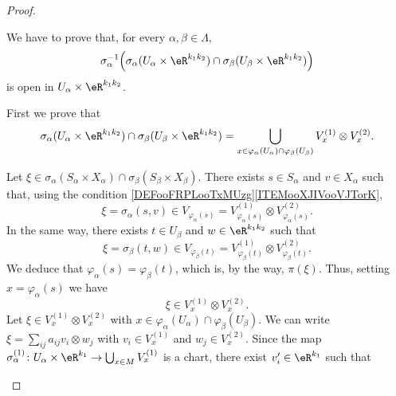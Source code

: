 \begin{proof}
\begin{subproof}
		We have to prove that, for every \( \alpha,\beta\in \Lambda\),
		\begin{equation}
			\sigma_{\alpha}^{-1}\Big( \sigma_{\alpha}(U_{\alpha}\times \eR^{k_1k_2})\cap \sigma_{\beta}(U_{\beta}\times \eR^{k_1k_2}) \Big)
		\end{equation}
		is open in \( U_{\alpha}\times \eR^{k_1k_2}\).

		First we prove that
		\begin{equation}		\label{EQooNWFCooWcxQxa}
			\sigma_{\alpha}(U_{\alpha}\times \eR^{k_1k_2})\cap \sigma_{\beta}(U_{\beta}\times \eR^{k_1k_2})=\bigcup_{x\in \varphi_{\alpha}(U_{\alpha})\cap \varphi_{\beta}(U_{\beta})}V_x^{(1)}\otimes V_x^{(2)}.
		\end{equation}
		\begin{subproof}
			Let \( \xi\in \sigma_{\alpha}(S_{\alpha}\times X_{\alpha})\cap \sigma_{\beta}(S_{\beta}\times X_{\beta})\). There exists \( s\in S_{\alpha}\) and \( v\in X_{\alpha}\) such that, using the condition \ref{DEFooFRPLooTxMUzg}\ref{ITEMooXJIVooVJTorK},
			\begin{equation}
				\xi=\sigma_{\alpha}(s,v)\in V_{\varphi_{\alpha}(s)}=V_{\varphi_{\alpha}(s)}^{(1)}\otimes V_{\varphi_{\alpha}(s)}^{(2)}.
			\end{equation}
			In the same way, there exists \( t\in U_{\beta}\) and \( w\in \eR^{k_1k_2}\) such that
			\begin{equation}
				\xi=\sigma_{\beta}(t,w)\in V_{\varphi_{\beta}(t)}=V_{\varphi_{\beta}(t)}^{(1)}\otimes V_{\varphi_{\beta}(t)}^{(2)}.
			\end{equation}
			We deduce that \( \varphi_{\alpha}(s)=\varphi_{\beta}(t)\), which is, by the way, \( \pi(\xi)\). Thus, setting \( x=\varphi_{\alpha}(s)\) we have
			\begin{equation}
				\xi\in V_x^{(1)}\otimes V_{x}^{(2)}.
			\end{equation}
			Let \( \xi\in V_x^{(1)}\otimes V_x^{(2)}\) with \( x\in \varphi_{\alpha}(U_{\alpha})\cap \varphi_{\beta}(U_{\beta})\). We can write \( \xi=\sum_{ij}a_{ij}v_i\otimes w_j\) with \( v_i\in V_x^{(1)}\) and \( w_j\in V_x^{(2)}\). Since the map \(\sigma_{\alpha}^{(1)} \colon U_{\alpha}\times \eR^{k_1}\to \bigcup_{x\in M}V_x^{(1)}  \) is a chart, there exist \( v'_i\in \eR^{k_1}\) such that

\end{subproof}
\end{subproof}
\end{proof}
